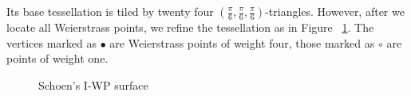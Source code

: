 \documentclass[12pt,reqno]{amsart}
\DeclareMathOperator{\Aut}{Aut}
\theoremstyle{definition}
\theoremstyle{remark}
\begin{document}
Its base tessellation is tiled by twenty four $(\frac{\pi}{6}, \frac{\pi}{6}, \frac{\pi}{6})$-triangles. However, after we locate all Weierstrass points, we refine the tessellation as in Figure~ \cref{fig:147}. The vertices marked as $\bullet$ are Weierstrass points of weight four, those marked as $\circ$ are points of weight one. 


\begin{figure}[htbp]
    \centering
    \qquad
    \qquad
    \caption{Schoen's I-WP surface}
    \label{fig:147}%
\end{figure}


\end{document}
